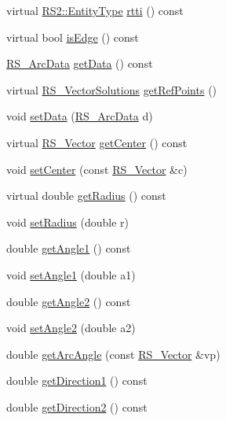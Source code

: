 \begin{DoxyCompactItemize}
\item 
virtual \hyperlink{classRS2_a8f26d1b981e1e85cff16738b43337e6a}{R\-S2\-::\-Entity\-Type} \hyperlink{classRS__Arc_a8ca1b97f31c1459231b08c26ea12f4f1}{rtti} () const 
\item 
virtual bool \hyperlink{classRS__Arc_ab43b2e4f0653855ef09f033180064f0d}{is\-Edge} () const 
\item 
\hyperlink{classRS__ArcData}{R\-S\-\_\-\-Arc\-Data} \hyperlink{classRS__Arc_a407c00ed764e3a54b2f898118c8e6eec}{get\-Data} () const 
\item 
virtual \hyperlink{classRS__VectorSolutions}{R\-S\-\_\-\-Vector\-Solutions} \hyperlink{classRS__Arc_a3aa4c95ec4f96ca15640da1d5248df24}{get\-Ref\-Points} ()
\item 
void \hyperlink{classRS__Arc_a7d258b231f57e7b10517be42f3cd3b58}{set\-Data} (\hyperlink{classRS__ArcData}{R\-S\-\_\-\-Arc\-Data} d)
\item 
virtual \hyperlink{classRS__Vector}{R\-S\-\_\-\-Vector} \hyperlink{classRS__Arc_a770ca9b629fbcb00c9ff5793319368d2}{get\-Center} () const 
\item 
void \hyperlink{classRS__Arc_a6f7417f017290a5d2dbbebfc113c71fb}{set\-Center} (const \hyperlink{classRS__Vector}{R\-S\-\_\-\-Vector} \&c)
\item 
virtual double \hyperlink{classRS__Arc_a91a3206d25bbba68057ce9c2402693aa}{get\-Radius} () const 
\item 
void \hyperlink{classRS__Arc_a9c6e09272b12cb9e2b866a21b618f418}{set\-Radius} (double r)
\item 
double \hyperlink{classRS__Arc_aa90bb8946ab7b9cf147a83f17e4e0b3f}{get\-Angle1} () const 
\item 
void \hyperlink{classRS__Arc_a407b5d8dfb56ec1351edcbec8beeb8cd}{set\-Angle1} (double a1)
\item 
double \hyperlink{classRS__Arc_a4b5120b205b93f7951a439bc5655cf1f}{get\-Angle2} () const 
\item 
void \hyperlink{classRS__Arc_ad1d47da7d18ba306f887959664193da8}{set\-Angle2} (double a2)
\item 
double \hyperlink{classRS__Arc_a5aee1087be6511f457ba42bcd8e3516b}{get\-Arc\-Angle} (const \hyperlink{classRS__Vector}{R\-S\-\_\-\-Vector} \&vp)
\item 
double \hyperlink{classRS__Arc_abf264d31301a3cf67d6fe10353d63a1c}{get\-Direction1} () const 
\item 
double \hyperlink{classRS__Arc_a0f98a3571be25d6c2d645191528c4f1f}{get\-Direction2} () const 
\item 

\end{DoxyCompactItemize}
